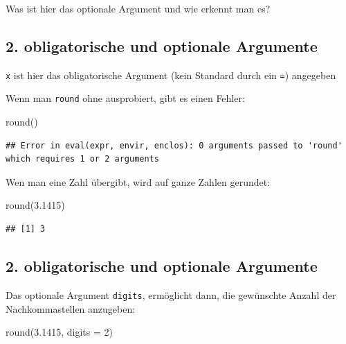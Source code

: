 \documentclass[
]{book}
\newenvironment{Shaded}{\begin{snugshade}}{\end{snugshade}}
\newcommand{\AttributeTok}[1]{\textcolor[rgb]{0.77,0.63,0.00}{#1}}
\newcommand{\DecValTok}[1]{\textcolor[rgb]{0.00,0.00,0.81}{#1}}
\newcommand{\FloatTok}[1]{\textcolor[rgb]{0.00,0.00,0.81}{#1}}
\newcommand{\FunctionTok}[1]{\textcolor[rgb]{0.00,0.00,0.00}{#1}}
\newcommand{\NormalTok}[1]{#1}
\begin{document}
Was ist hier das optionale Argument und wie erkennt man es?

\hypertarget{obligatorische-und-optionale-argumente-2}{%
\subsection{2. obligatorische und optionale Argumente}\label{obligatorische-und-optionale-argumente-2}}

\texttt{x} ist hier das obligatorische Argument (kein Standard durch ein \texttt{=}) angegeben

Wenn man \texttt{round} ohne ausprobiert, gibt es einen Fehler:

\begin{Shaded}
\begin{Highlighting}[]
\FunctionTok{round}\NormalTok{()}
\end{Highlighting}
\end{Shaded}

\begin{verbatim}
## Error in eval(expr, envir, enclos): 0 arguments passed to 'round' which requires 1 or 2 arguments
\end{verbatim}

Wen man eine Zahl übergibt, wird auf ganze Zahlen gerundet:

\begin{Shaded}
\begin{Highlighting}[]
\FunctionTok{round}\NormalTok{(}\FloatTok{3.1415}\NormalTok{)}
\end{Highlighting}
\end{Shaded}

\begin{verbatim}
## [1] 3
\end{verbatim}

\hypertarget{obligatorische-und-optionale-argumente-3}{%
\subsection{2. obligatorische und optionale Argumente}\label{obligatorische-und-optionale-argumente-3}}

Das optionale Argument \texttt{digits}, ermöglicht dann, die gewünschte Anzahl der Nachkommastellen anzugeben:

\begin{Shaded}
\begin{Highlighting}[]
\FunctionTok{round}\NormalTok{(}\FloatTok{3.1415}\NormalTok{, }\AttributeTok{digits =} \DecValTok{2}\NormalTok{)}
\end{Highlighting}
\end{Shaded}
\end{document}
